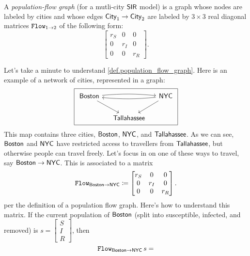 \documentclass[DynamicalBook]{subfiles}
\begin{document}
\begin{definition}\label{def.population_flow_graph}
  A \emph{population-flow graph} (for a mutli-city $\mathsf{SIR}$ model) is a graph
  whose nodes are labeled by cities and whose edges $\mathsf{City}_1 \to
  \mathsf{City}_2$ are labeled by
  $3 \times 3$ real diagonal matrices $\mathtt{Flow}_{1\to
    2}$ of the following form:
  \[
\begin{bmatrix} 
  r_S & 0 & 0 \\
  0 & r_I & 0 \\
  0 & 0 & r_R 
\end{bmatrix}.
\]

\end{definition}

\begin{example}\label{ex.population_flow_graph}
Let's take a minute to understand \cref{def.population_flow_graph}. Here is an
example of a network of cities, represented in a graph:
\begin{equation}\label{eqn.population_flow_graph}
\begin{tikzpicture}
	\node[draw] {
  \begin{tikzcd}[column sep=small]
    \Sys{Boston} \ar[rr, bend left=5]\ar[rr, bend right=5, leftarrow] \ar[dr] &  & \ar[dl]\Sys{NYC}\\
& \Sys{Tallahassee} &
  \end{tikzcd}
  };
\end{tikzpicture}
\end{equation}
This map contains three cities, $\mathsf{Boston}$, $\mathsf{NYC}$, and
$\mathsf{Tallahassee}$. As we can see, $\mathsf{Boston}$ and $\mathsf{NYC}$ have
restricted access to travellers from $\mathsf{Tallahassee}$, but otherwise people
can travel freely. Let's focus in on one of these ways to travel, say
$\mathsf{Boston} \to \mathsf{NYC}$. This is associated to a matrix
\[
\mathtt{Flow}_{\mathsf{Boston} \to \mathsf{NYC}} \coloneqq
\begin{bmatrix} 
  r_S & 0 & 0 \\
  0 & r_I & 0 \\
  0 & 0 & r_R 
\end{bmatrix}.
\]
per the definition of a population flow graph. Here's how to understand this
matrix. If the current population of $\mathsf{Boston}$ (split into susceptible,
infected, and removed) is $s = \begin{bmatrix}S \\ I \\ R\end{bmatrix}$, then 
\[
  \mathtt{Flow}_{\mathsf{Boston} \to \mathsf{NYC}}\, s = 
\]
\end{example}
\end{document}
